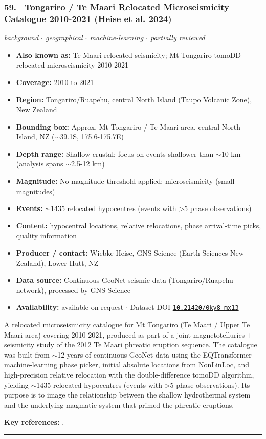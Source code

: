 \documentclass[10pt,a4paper]{article}
\newcommand{\catentryrule}{\par\vspace{3pt}\noindent\textcolor{rulegrey}{\rule{\linewidth}{0.3pt}}\par\vspace{5pt}}
\newcommand{\kv}[2]{\item \textbf{#1:} #2}
\begin{document}
\subsubsection*{\hypertarget{c:59}{59.}~ Tongariro / Te Maari Relocated Microseismicity Catalogue 2010-2021 (Heise et al. 2024)}
{\small\itshape background $\cdot$ geographical $\cdot$ machine-learning $\cdot$ partially reviewed}\par\vspace{2pt}
\begin{itemize}[leftmargin=1.3em,itemsep=0.6pt,topsep=1pt,parsep=0pt]
\kv{Also known as}{Te Maari relocated seismicity; Mt Tongariro tomoDD relocated microseismicity 2010-2021}
\kv{Coverage}{2010 to 2021}
\kv{Region}{Tongariro/Ruapehu, central North Island (Taupo Volcanic Zone), New Zealand}
\kv{Bounding box}{Approx. Mt Tongariro / Te Maari area, central North Island, NZ ($\sim$39.1S, 175.6-175.7E)}
\kv{Depth range}{Shallow crustal; focus on events shallower than $\sim$10 km (analysis spans $\sim$2.5-12 km)}
\kv{Magnitude}{No magnitude threshold applied; microseismicity (small magnitudes)}
\kv{Events}{$\sim$1435 relocated hypocentres (events with \textgreater{}5 phase observations)}
\kv{Content}{hypocentral locations, relative relocations, phase arrival-time picks, quality information}
\kv{Producer / contact}{Wiebke Heise, GNS Science (Earth Sciences New Zealand), Lower Hutt, NZ}
\kv{Data source}{Continuous GeoNet seismic data (Tongariro/Ruapehu network), processed by GNS Science}
\kv{Availability}{available on request $\cdot$ Dataset DOI \href{https://doi.org/10.21420/0ky8-mx13}{\nolinkurl{10.21420/0ky8-mx13}}}
\end{itemize}
\par\vspace{2pt}A relocated microseismicity catalogue for Mt Tongariro (Te Maari / Upper Te Maari area) covering 2010-2021, produced as part of a joint magnetotellurics + seismicity study of the 2012 Te Maari phreatic eruption sequence. The catalogue was built from $\sim$12 years of continuous GeoNet data using the EQTransformer machine-learning phase picker, initial absolute locations from NonLinLoc, and high-precision relative relocation with the double-difference tomoDD algorithm, yielding $\sim$1435 relocated hypocentres (events with \textgreater{}5 phase observations). Its purpose is to image the relationship between the shallow hydrothermal system and the underlying magmatic system that primed the phreatic eruptions.
\par\vspace{2pt}\textbf{Key references:} \cite{Heise2024}.
\catentryrule
\end{document}
